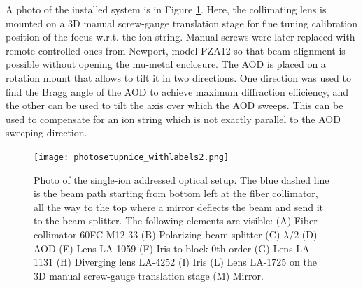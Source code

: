 A photo of the installed system is in Figure \ref{photosetup}. Here, the collimating lens is mounted on a 3D manual screw-gauge translation stage for fine tuning calibration position of the focus w.r.t. the ion string. Manual screws were later replaced with remote controlled ones from Newport, model PZA12 so that beam alignment is possible without opening the mu-metal enclosure. The AOD is placed on a rotation mount that allows to tilt it in two directions. One direction was used to find the Bragg angle of the AOD to achieve maximum diffraction efficiency, and the other can be used to tilt the axis over which the AOD sweeps. This can be used to compensate for an ion string which is not exactly parallel to the AOD sweeping direction.

\begin{figure}[H]
\centering
\texttt{[image: photosetupnice\_withlabels2.png]}
\caption{Photo of the single-ion addressed optical setup. The blue dashed line is the beam path starting from bottom left at the fiber collimator, all the way to the top where a mirror deflects the beam and send it to the beam splitter. The following elements are visible: (A) Fiber collimator 60FC-M12-33 (B) Polarizing beam splitter (C) $\lambda/2$ (D) AOD (E) Lens LA-1059 (F) Iris to block 0th order (G) Lens LA-1131 (H) Diverging lens LA-4252 (I) Iris (L) Lens LA-1725 on the 3D manual screw-gauge translation stage (M) Mirror. }
\label{photosetup}
\end{figure}
